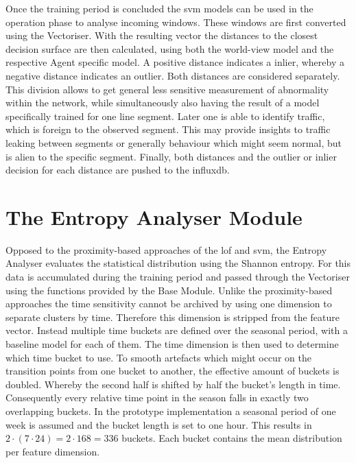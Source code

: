 Once the training period is concluded the \gls{svm} models can be used in the operation phase to analyse incoming windows.
These windows are first converted using the Vectoriser. With the resulting vector the distances to the closest decision surface are then calculated, using both the world-view model and the respective Agent specific model.
A positive distance indicates a inlier, whereby a negative distance indicates an outlier.
Both distances are considered separately. This division allows to get general less sensitive measurement of abnormality within the network, while simultaneously also having the result of a model specifically trained for one line segment. Later one is able to identify traffic, which is foreign to the observed segment. This may provide insights to traffic leaking between segments or generally behaviour which might seem normal, but is alien to the specific segment.
Finally, both distances and the outlier or inlier decision for each distance are pushed to the \gls{influxdb}.

\section{The Entropy Analyser Module}
\label{sec:impl:entropy}

Opposed to the proximity-based approaches of the \gls{lof} and \gls{svm}, the Entropy Analyser evaluates the statistical distribution using the Shannon entropy. \parencite[cf.][]{Shannon1948}
For this data is accumulated during the training period and passed through the Vectoriser using the functions provided by the Base Module.
Unlike the proximity-based approaches the time sensitivity cannot be archived by using one dimension to separate clusters by time. Therefore this dimension is stripped from the feature vector. Instead multiple time buckets are defined over the seasonal period, with a baseline model for each of them. The time dimension is then used to determine which time bucket to use.
To smooth artefacts which might occur on the transition points from one bucket to another, the effective amount of buckets is doubled. Whereby the second half is shifted by half the bucket's length in time.
Consequently every relative time point in the season falls in exactly two overlapping buckets.
In the prototype implementation a seasonal period of one week is assumed and the bucket length is set to one hour. This results in $2 \cdot (7 \cdot 24) = 2 \cdot 168 = 336$ buckets. Each bucket contains the mean distribution per feature dimension.


